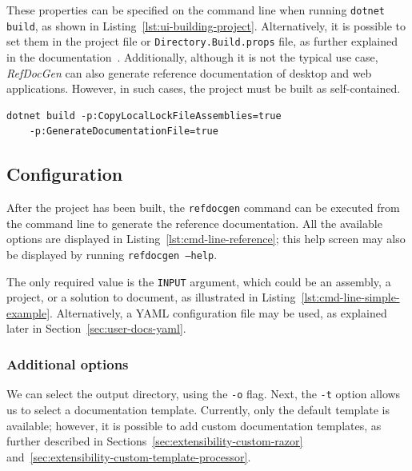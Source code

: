 These properties can be specified on the command line when running \texttt{dotnet build}, as shown in Listing~\ref{lst:ui-building-project}.
Alternatively, it is possible to set them in the project file or \texttt{Directory.Build.props} file, as further explained in the documentation~\cite{net_customize_build}.
Additionally, although it is not the typical use case, \textit{RefDocGen} can also generate reference documentation of desktop and web applications. However, in such cases, the project must be built as self-contained.

\begin{listing}[H]
\begin{lstlisting}[language=HTML]
dotnet build -p:CopyLocalLockFileAssemblies=true
    -p:GenerateDocumentationFile=true
\end{lstlisting}
\caption{Building the project}
\label{lst:ui-building-project}
\end{listing}

\subsection*{Configuration}

After the project has been built, the \texttt{refdocgen} command can be executed from the command line to generate the reference documentation.
All the available options are displayed in Listing~\ref{lst:cmd-line-reference}; this help screen may also be displayed by running \texttt{refdocgen --help}.

The only required value is the \texttt{INPUT} argument, which could be an assembly, a project, or a solution to document, as illustrated in Listing~\ref{lst:cmd-line-simple-example}.
Alternatively, a YAML configuration file may be used, as explained later in Section~\ref{sec:user-docs-yaml}.

\subsubsection*{Additional options}

We can select the output directory, using the \texttt{-o} flag.
Next, the \texttt{-t} option allows us to select a documentation template. 
Currently, only the default template is available; however, it is possible to add custom documentation templates, as further described in Sections~\ref{sec:extensibility-custom-razor} and~\ref{sec:extensibility-custom-template-processor}.

